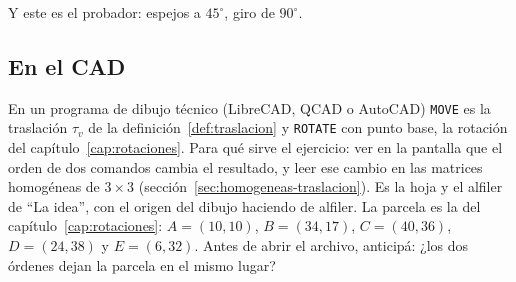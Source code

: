\begin{center}
\end{center}

Y este es el probador: espejos a \(45^\circ\), giro de \(90^\circ\).

\subsection{En el CAD}\label{sec:cad-cap02}

En un programa de dibujo técnico (LibreCAD, QCAD o AutoCAD) \texttt{MOVE} es la traslación
\(\tau_v\) de la definición~\ref{def:traslacion} y \texttt{ROTATE} con punto base, la rotación
del capítulo~\ref{cap:rotaciones}. Para qué sirve el ejercicio: ver en la pantalla que el orden
de dos comandos cambia el resultado, y leer ese cambio en las matrices homogéneas de
\(3\times3\) (sección~\ref{sec:homogeneas-traslacion}). Es la hoja y el alfiler de \enquote{La idea},
con el origen del dibujo haciendo de alfiler. La parcela es la del
capítulo~\ref{cap:rotaciones}: \(A=(10,10)\), \(B=(34,17)\), \(C=(40,36)\), \(D=(24,38)\) y
\(E=(6,32)\). Antes de abrir el archivo, anticipá: ¿los dos órdenes dejan la parcela en el
mismo lugar?

